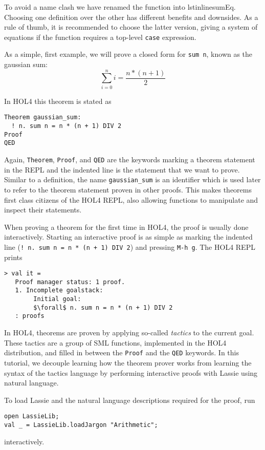 \documentclass[10pt]{scrartcl}
\newcommand{\ekey}[1]{\texttt{#1}}
\begin{document}
To avoid a name clash we have renamed the function into lstinline{sumEq}.
Choosing one definition over the other has different benefits and downsides.
As a rule of thumb, it is recommended to choose the latter version, giving a
system of equations if the function requires a top-level \texttt{case}
expression.

As a simple, first example, we will prove a closed form for \lstinline{sum n},
known as the gaussian sum:
\[
  \sum_{i=0}^{n} i = \frac{n * (n + 1)}{2}
\]

In HOL4 this theorem is stated as

\begin{lstlisting}
Theorem gaussian_sum:
  ! n. sum n = n * (n + 1) DIV 2
Proof
QED
\end{lstlisting}

Again, \lstinline{Theorem}, \lstinline{Proof}, and \lstinline{QED} are the
keywords marking a theorem statement in the REPL and the indented line is
the statement that we want to prove.
Similar to a definition, the name \lstinline{gaussian_sum} is an identifier
which is used later to refer to the theorem statement proven in other proofs.
This makes theorems first class citizens of the HOL4 REPL, also allowing
functions to manipulate and inspect their statements.

When proving a theorem for the first time in HOL4, the proof is usually done
interactively.
Starting an interactive proof is as simple as marking the indented line
(\lstinline{! n. sum n = n * (n + 1) DIV 2}) and pressing \ekey{M-h g}.
The HOL4 REPL prints

\begin{lstlisting}[mathescape=true, frame=single]
> val it =
   Proof manager status: 1 proof.
   1. Incomplete goalstack:
        Initial goal:
        $\forall$ n. sum n = n * (n + 1) DIV 2
   : proofs
\end{lstlisting}

In HOL4, theorems are proven by applying so-called \emph{tactics} to the current
goal.
These tactics are a group of SML functions, implemented in the HOL4
distribution, and filled in between the \lstinline{Proof} and the \lstinline{QED}
keywords.
In this tutorial, we decouple learning how the theorem prover works from
learning the syntax of the tactics language by performing interactive proofs
with Lassie using natural language.

To load Lassie and the natural language descriptions required for the proof,
run
\begin{lstlisting}
open LassieLib;
val _ = LassieLib.loadJargon "Arithmetic";
\end{lstlisting}
interactively.
\end{document}
